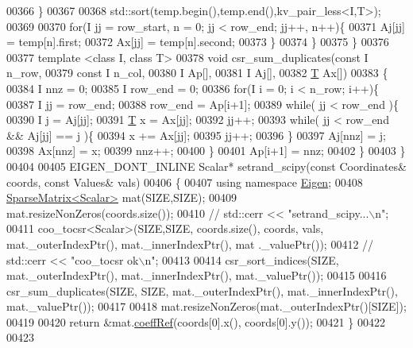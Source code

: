 \begin{DoxyCode}
00366         \}
00367 
00368         std::sort(temp.begin(),temp.end(),kv\_pair\_less<I,T>);
00369 
00370         \textcolor{keywordflow}{for}(I jj = row\_start, n = 0; jj < row\_end; jj++, n++)\{
00371             Aj[jj] = temp[n].first;
00372             Ax[jj] = temp[n].second;
00373         \}
00374     \}
00375 \}
00376 
00377 \textcolor{keyword}{template} <\textcolor{keyword}{class} I, \textcolor{keyword}{class} T>
00378 \textcolor{keywordtype}{void} csr\_sum\_duplicates(\textcolor{keyword}{const} I n\_row,
00379                         \textcolor{keyword}{const} I n\_col,
00380                               I Ap[],
00381                               I Aj[],
00382                               \hyperlink{group___sparse_core___module}{T} Ax[])
00383 \{
00384     I nnz = 0;
00385     I row\_end = 0;
00386     \textcolor{keywordflow}{for}(I i = 0; i < n\_row; i++)\{
00387         I jj = row\_end;
00388         row\_end = Ap[i+1];
00389         \textcolor{keywordflow}{while}( jj < row\_end )\{
00390             I j = Aj[jj];
00391             \hyperlink{group___sparse_core___module}{T} x = Ax[jj];
00392             jj++;
00393             \textcolor{keywordflow}{while}( jj < row\_end && Aj[jj] == j )\{
00394                 x += Ax[jj];
00395                 jj++;
00396             \}
00397             Aj[nnz] = j;
00398             Ax[nnz] = x;
00399             nnz++;
00400         \}
00401         Ap[i+1] = nnz;
00402     \}
00403 \}
00404 
00405 EIGEN\_DONT\_INLINE Scalar* setrand\_scipy(\textcolor{keyword}{const} Coordinates& coords, \textcolor{keyword}{const} Values& vals)
00406 \{
00407   \textcolor{keyword}{using namespace }\hyperlink{namespace_eigen}{Eigen};
00408   \hyperlink{group___sparse_core___module}{SparseMatrix<Scalar>} mat(SIZE,SIZE);
00409   mat.resizeNonZeros(coords.size());
00410 \textcolor{comment}{//   std::cerr << "setrand\_scipy...\(\backslash\)n";}
00411   coo\_tocsr<Scalar>(SIZE,SIZE, coords.size(), coords, vals, mat.\_outerIndexPtr(), mat.\_innerIndexPtr(), mat
      .\_valuePtr());
00412 \textcolor{comment}{//   std::cerr << "coo\_tocsr ok\(\backslash\)n";}
00413 
00414   csr\_sort\_indices(SIZE, mat.\_outerIndexPtr(), mat.\_innerIndexPtr(), mat.\_valuePtr());
00415 
00416   csr\_sum\_duplicates(SIZE, SIZE, mat.\_outerIndexPtr(), mat.\_innerIndexPtr(), mat.\_valuePtr());
00417 
00418   mat.resizeNonZeros(mat.\_outerIndexPtr()[SIZE]);
00419 
00420   \textcolor{keywordflow}{return} &mat.\hyperlink{group___sparse_core___module_a013197b3f598968ff37ed8c97087f1ef}{coeffRef}(coords[0].x(), coords[0].y());
00421 \}
00422 
00423 

\end{DoxyCode}
